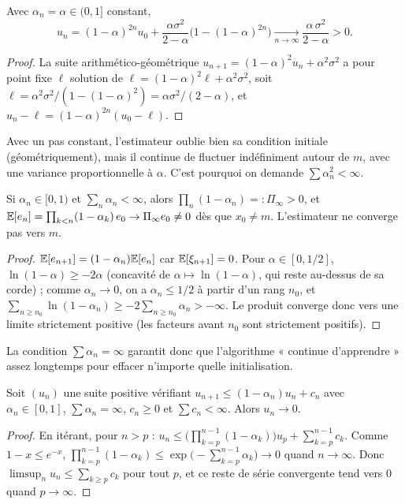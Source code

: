 \begin{proposition}\label{prop-rm-const}
Avec $\alpha_n=\alpha\in(0,1]$ constant,
\[
u_n=(1-\alpha)^{2n}u_0+\frac{\alpha\sigma^2}{2-\alpha}\Big(1-(1-\alpha)^{2n}\Big)\xrightarrow[n\to\infty]{}\frac{\alpha\,\sigma^2}{2-\alpha}>0.
\]
\end{proposition}
\begin{proof}
La suite arithmético-géométrique $u_{n+1}=(1-\alpha)^2u_n+\alpha^2\sigma^2$ a pour point fixe $\ell$ solution de $\ell=(1-\alpha)^2\ell+\alpha^2\sigma^2$, soit $\ell=\alpha^2\sigma^2/(1-(1-\alpha)^2)=\alpha\sigma^2/(2-\alpha)$, et $u_n-\ell=(1-\alpha)^{2n}(u_0-\ell)$.
\end{proof}

Avec un pas constant, l'estimateur oublie bien sa condition initiale (géométriquement), mais il continue de fluctuer indéfiniment autour de $m$, avec une variance proportionnelle à $\alpha$. C'est pourquoi on demande $\sum\alpha_n^2<\infty$.

\begin{proposition}\label{prop-rm-sommable}
Si $\alpha_n\in[0,1)$ et $\sum_n\alpha_n<\infty$, alors $\prod_{n}(1-\alpha_n)=:\Pi_\infty>0$, et $\mathbb{E}[e_n]=\prod_{k<n}(1-\alpha_k)\,e_0\to\Pi_\infty e_0\neq0$ dès que $x_0\neq m$. L'estimateur ne converge pas vers $m$.
\end{proposition}
\begin{proof}
$\mathbb{E}[e_{n+1}]=(1-\alpha_n)\mathbb{E}[e_n]$ car $\mathbb{E}[\xi_{n+1}]=0$. Pour $\alpha\in[0,1/2]$, $\ln(1-\alpha)\ge-2\alpha$ (concavité de $\alpha\mapsto\ln(1-\alpha)$, qui reste au-dessus de sa corde) ; comme $\alpha_n\to0$, on a $\alpha_n\le1/2$ à partir d'un rang $n_0$, et $\sum_{n\ge n_0}\ln(1-\alpha_n)\ge-2\sum_{n\ge n_0}\alpha_n>-\infty$. Le produit converge donc vers une limite strictement positive (les facteurs avant $n_0$ sont strictement positifs).
\end{proof}

La condition $\sum\alpha_n=\infty$ garantit donc que l'algorithme « continue d'apprendre » assez longtemps pour effacer n'importe quelle initialisation.

\begin{lemme}\label{lem-chung}
Soit $(u_n)$ une suite positive vérifiant $u_{n+1}\le(1-\alpha_n)u_n+c_n$ avec $\alpha_n\in[0,1]$, $\sum\alpha_n=\infty$, $c_n\ge0$ et $\sum c_n<\infty$. Alors $u_n\to0$.
\end{lemme}
\begin{proof}
En itérant, pour $n>p$ : $u_n\le\Big(\prod_{k=p}^{n-1}(1-\alpha_k)\Big)u_p+\sum_{k=p}^{n-1}c_k$. Comme $1-x\le e^{-x}$, $\prod_{k=p}^{n-1}(1-\alpha_k)\le\exp\big(-\sum_{k=p}^{n-1}\alpha_k\big)\to0$ quand $n\to\infty$. Donc $\limsup_nu_n\le\sum_{k\ge p}c_k$ pour tout $p$, et ce reste de série convergente tend vers $0$ quand $p\to\infty$.
\end{proof}

